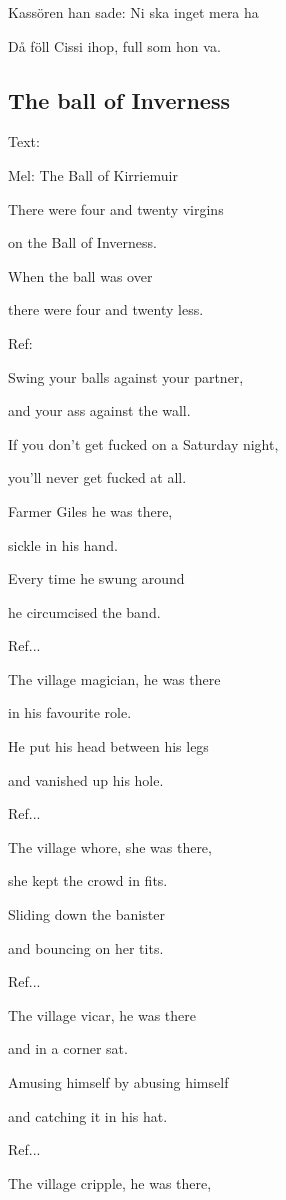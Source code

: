 Kassören han sade: Ni ska inget mera ha

Då föll Cissi ihop, full som hon va. 

\subsection{\textbf{The ball of Inverness}}

Text: 

Mel: The Ball of Kirriemuir\bigskip


There were four and twenty virgins

on the Ball of Inverness.

When the ball was over

there were four and twenty less.\bigskip


Ref:\bigskip


Swing your balls against your partner,

and your ass against the wall.

If you don't get fucked on a Saturday night,

you'll never get fucked at all.\bigskip


Farmer Giles he was there,

sickle in his hand.

Every time he swung around

he circumcised the band.\bigskip


Ref...\bigskip


The village magician, he was there

in his favourite role.

He put his head between his legs

and vanished up his hole.\bigskip


Ref...\bigskip


The village whore, she was there,

she kept the crowd in fits.

Sliding down the banister

and bouncing on her tits.\bigskip


Ref... \bigskip


The village vicar, he was there

and in a corner sat.

Amusing himself by abusing himself

and catching it in his hat.\bigskip


Ref...\bigskip


The village cripple, he was there,\bigskip

